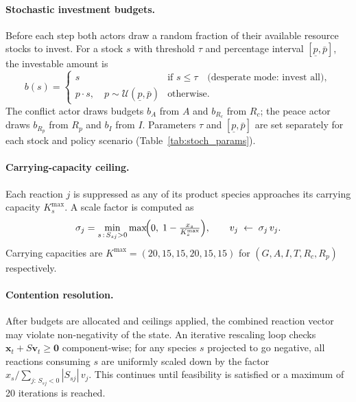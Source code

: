 \paragraph{Stochastic investment budgets.}
Before each step both actors draw a random fraction of their available resource
stocks to invest.  For a stock $s$ with threshold $\tau$ and percentage
interval $[\underline{p},\bar{p}]$, the investable amount is
\begin{equation}
    b(s) =
    \begin{cases}
        s & \text{if } s \leq \tau \quad \text{(desperate mode: invest all)},\\[4pt]
        p\cdot s, \quad p \sim \mathcal{U}(\underline{p},\bar{p}) & \text{otherwise}.
    \end{cases}
\end{equation}
The conflict actor draws budgets $b_A$ from $A$ and $b_{R_c}$ from $R_c$; the
peace actor draws $b_{R_p}$ from $R_p$ and $b_I$ from $I$.  Parameters
$\tau$ and $[\underline{p},\bar{p}]$ are set separately for each stock and
policy scenario (Table~\ref{tab:stoch_params}).

\paragraph{Carrying-capacity ceiling.}
Each reaction $j$ is suppressed as any of its product species approaches its
carrying capacity $K_s^{\max}$.  A scale factor is computed as
\begin{equation}
    \sigma_j = \min_{s\,:\,S_{sj}>0}
               \max\!\Bigl(0,\;1 - \tfrac{x_s}{K_s^{\max}}\Bigr),
    \qquad v_j \;\leftarrow\; \sigma_j\,v_j.
\end{equation}
Carrying capacities are $K^{\max} = (20,15,15,20,15,15)$ for
$(G,A,I,T,R_c,R_p)$ respectively.

\paragraph{Contention resolution.}
After budgets are allocated and ceilings applied, the combined reaction vector
may violate non-negativity of the state.  An iterative rescaling loop checks
$\mathbf{x}_t + S\mathbf{v}_t \geq \mathbf{0}$ component-wise; for any species
$s$ projected to go negative, all reactions consuming $s$ are uniformly scaled
down by the factor $x_s / \sum_{j:\,S_{sj}<0} |S_{sj}|\,v_j$.  This continues
until feasibility is satisfied or a maximum of 20 iterations is reached.

